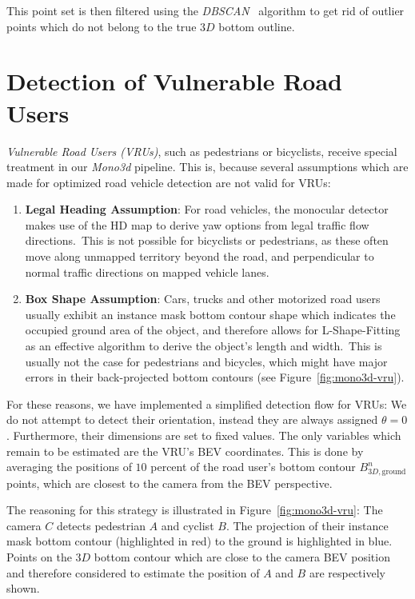 This point set is then filtered using the \textit{DBSCAN}~\cite{schubert2017dbscan} algorithm to get rid of outlier points which do not belong to the true $3D$ bottom outline.

\section{Detection of Vulnerable Road Users}
\label{sec:pedcyc}

\textit{Vulnerable Road Users (VRUs)}, such as pedestrians or bicyclists, receive special treatment in our \textit{Mono3d} pipeline.
This is, because several assumptions which are made for optimized road vehicle detection are not valid for VRUs:

\begin{enumerate}
    \item \textbf{Legal Heading Assumption}: For road vehicles, the monocular detector makes use of the HD map to derive yaw options from legal traffic flow directions.\ This is not possible for bicyclists or pedestrians, as these often move along unmapped territory beyond the road, and perpendicular to normal traffic directions on mapped vehicle lanes.
    \item \textbf{Box Shape Assumption}: Cars, trucks and other motorized road users usually exhibit an instance mask bottom contour shape which indicates the occupied ground area of the object, and therefore allows for L-Shape-Fitting as an effective algorithm to derive the object's length and width.\ This is usually not the case for pedestrians and bicycles, which might have major errors in their back-projected bottom contours (see Figure~\ref{fig:mono3d-vru}).
\end{enumerate}

For these reasons, we have implemented a simplified detection flow for VRUs: We do not attempt to detect their orientation, instead they are always assigned $\theta=0$.
Furthermore, their dimensions are set to fixed values.
The only variables which remain to be estimated are the VRU's BEV coordinates.
This is done by averaging the positions of $10$ percent of the road user's bottom contour $B^n_{3D,\text{ground}}$ points, which are closest to the camera from the BEV perspective.

The reasoning for this strategy is illustrated in Figure~\ref{fig:mono3d-vru}:
The camera $C$ detects pedestrian $A$ and cyclist $B$.
The projection of their instance mask bottom contour (highlighted in red) to the ground is highlighted in blue.
Points on the $3D$ bottom contour which are close to the camera BEV position and therefore considered to estimate the position of $A$ and $B$ are respectively shown.

